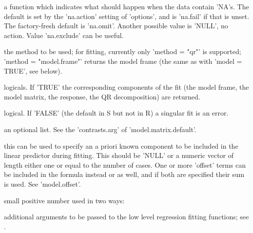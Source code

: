 \documentclass{article}
\begin{document}
\begin{Arguments}
\begin{ldescription}
\item[\code{ na.action }] a function which indicates what should happen when the data contain
'NA's.  The default is set by the 'na.action' setting of 'options',
and is 'na.fail' if that is unset.  The factory-fresh default is
'na.omit'.  Another possible value is 'NULL', no action.  Value
'na.exclude' can be useful. 

\item[\code{method}] the method to be used; for fitting, currently only 'method = "qr"'
is supported; 'method = "model.frame"' returns the model frame (the
same as with 'model = TRUE', see below). 

\item[\code{model, x, y, qr}] logicals.  If 'TRUE' the corresponding components of the fit (the
model frame, the model matrix, the response, the QR decomposition)
are returned. 

\item[\code{ singular.ok }] logical. If 'FALSE' (the default in S but not in R) a singular fit
is an error.

\item[\code{ contrasts }] an optional list. See the 'contrasts.arg' of
'model.matrix.default'. 

\item[\code{offset}] this can be used to specify an a priori known component to be
included in the linear predictor during fitting.  This should be
'NULL' or a numeric vector of length either one or equal to the
number of cases. One or more 'offset' terms can be included in the
formula instead or as well, and if both are specified their sum is
used.  See 'model.offset'. 

\item[\code{eps}] small positive number used in two ways:


\item[\code{...}] additional arguments to be passed to the low level regression
fitting functions;  see . 

\end{ldescription}
\end{Arguments}
\end{document}
